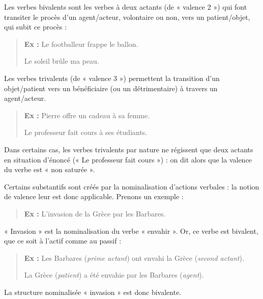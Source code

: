 Les verbes bivalents sont les verbes à deux actants (de « valence 2 ») qui font transiter le procès d’un agent/acteur, volontaire ou non, vers un patient/objet, qui subit ce procès :
\begin{quote}
\textbf{Ex :} Le footballeur frappe le ballon.\par
Le soleil brûle ma peau.
\end{quote}

Les verbes trivalents (de « valence 3 ») permettent la transition d’un objet/patient vers un bénéficiaire (ou un détrimentaire) à travers un agent/acteur.
\begin{quote}
\textbf{Ex :} Pierre offre un cadeau à sa femme.\par
Le professeur fait cours à ses étudiants.
\end{quote}
Dans certains cas, les verbes trivalents par nature ne régissent que deux actants en situation d’énoncé (« Le professeur fait cours ») : on dit alors que la valence du verbe est « non saturée ».

Certains substantifs sont créés par la nominalisation d’actions verbales : la notion de valence leur est donc applicable. Prenons un exemple :
\begin{quote}\textbf{Ex :} L’invasion de la Grèce par les Barbares.\end{quote}
« Invasion » est la nominalisation du verbe « envahir ». Or, ce verbe est bivalent, que ce soit à l’actif comme au passif :
\begin{quote}
\textbf{Ex :} Les Barbares (\textit{prime actant}) ont envahi la Grèce (\textit{second actant}).\par
La Grèce (\textit{patient}) a été envahie par les Barbares (\textit{agent}).
\end{quote}
La structure nominalisée « invasion » est donc bivalente.

